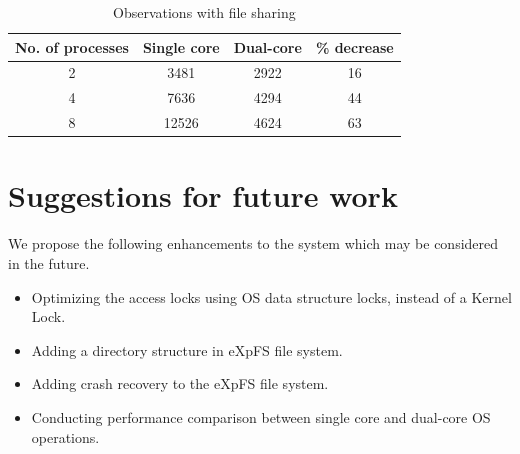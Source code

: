 \documentclass[12pt]{report}
\begin{document}
\begin{table}[h!]
    \centering
    \begin{tabular}{|c|c|c|c|}
        \hline
        \textbf{No. of processes} & \textbf{Single core} & \textbf{Dual-core} & \textbf{\% decrease}\\
        \hline
        2 & 3481 & 2922 & 16 \\
        \hline
        4 & 7636 & 4294 & 44 \\
        \hline
        8 & 12526 & 4624 & 63 \\
        \hline
    \end{tabular}
    \caption{Observations with file sharing}
    \label{obs3}
\end{table}

\section{Suggestions for future work}
We propose the following enhancements to the system which may be considered in the future.  
\begin{itemize}
    \item Optimizing the access locks using OS data structure locks, instead of a Kernel Lock.
    \item Adding a directory structure in eXpFS file system.
    \item Adding crash recovery to the eXpFS file system. 
    \item Conducting performance comparison between single core and dual-core OS operations.
\end{itemize}

\nocite{*}


\end{document}
